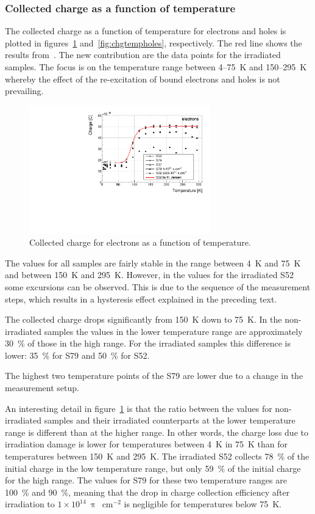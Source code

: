 \subsubsection{Collected charge as a function of temperature}
\label{subsec:qvst}
 The collected charge as a function of temperature for electrons and holes is plotted in figures~\ref{fig:chgtempelecs} and~\ref{fig:chgtempholes}, respectively. The red line shows the results from~\cite{Jansen:1956431}. The new contribution are the data points for the irradiated samples. The focus is on the temperature range between 4--75~K and 150--295~K whereby the effect of the re-excitation of bound electrons and holes is not prevailing.
\begin{figure}[!t]
\centering
\includegraphics[width=0.70\textwidth]{../scripts/03_experimental_results/plots/charge500V} 
\caption{Collected charge for electrons as a function of temperature.}
\label{fig:chgtempelecs}
\end{figure}
The values for all samples are fairly stable in the range between 4~K and 75~K and between 150~K and 295~K. However, in the values for the irradiated S52 some excursions can be observed. This is due to the sequence of the measurement steps, which results in a hysteresis effect explained in the preceding text.

The collected charge drops significantly from 150~K down to 75~K. In the non-irradiated samples the values in the lower temperature range are approximately 30~\% of those in the high range. For the irradiated samples this difference is lower: 35~\% for S79 and 50~\% for S52.

The highest two temperature points of the S79 are lower due to a change in the measurement setup.

An interesting detail in figure~\ref{fig:chgtempelecs} is that the ratio between the values for non-irradiated samples and their irradiated counterparts at the lower temperature range is different than at the higher range. In other words, the charge loss due to irradiation damage is lower for temperatures between 4~K in 75~K than for temperatures between 150~K and 295~K. The irradiated S52 collects 78~\% of the initial charge in the low temperature range, but only 59~\% of the initial charge for the high range. The values for S79 for these two temperature ranges are 100~\% and 90~\%, meaning that the drop in charge collection efficiency after irradiation to $1\times10^{14}~\uppi$~cm$^{-2}$ is negligible for temperatures below 75~K.

